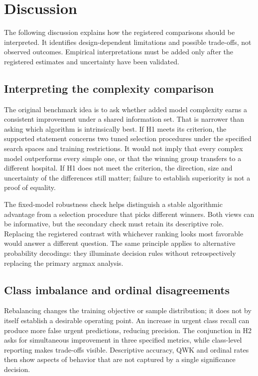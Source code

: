 \section{Discussion}
The following discussion explains how the registered comparisons should be
interpreted. It identifies design-dependent limitations and possible
trade-offs, not observed outcomes. Empirical interpretations must be added
only after the registered estimates and uncertainty have been validated.

\subsection{Interpreting the complexity comparison}
The original benchmark idea is to ask whether added model complexity earns
a consistent improvement under a shared information set. That is narrower
than asking which algorithm is intrinsically best. If H1 meets its
criterion, the supported statement concerns two tuned selection procedures
under the specified search spaces and training restrictions. It would not
imply that every complex model outperforms every simple one, or that the
winning group transfers to a different hospital. If H1 does not meet the
criterion, the direction, size and uncertainty of the differences still
matter; failure to establish superiority is not a proof of equality.

The fixed-model robustness check helps distinguish a stable algorithmic
advantage from a selection procedure that picks different winners. Both
views can be informative, but the secondary check must retain its
descriptive role. Replacing the registered contrast with whichever ranking
looks most favorable would answer a different question. The same principle
applies to alternative probability decodings: they illuminate decision
rules without retrospectively replacing the primary argmax analysis.

\subsection{Class imbalance and ordinal disagreements}
Rebalancing changes the training objective or sample distribution; it does
not by itself establish a desirable operating point. An increase in urgent
class recall can produce more false urgent predictions, reducing precision.
The conjunction in H2 asks for simultaneous improvement in three specified
metrics, while class-level reporting makes trade-offs visible. Descriptive
accuracy, QWK and ordinal rates then show aspects of behavior that are not
captured by a single significance decision.

